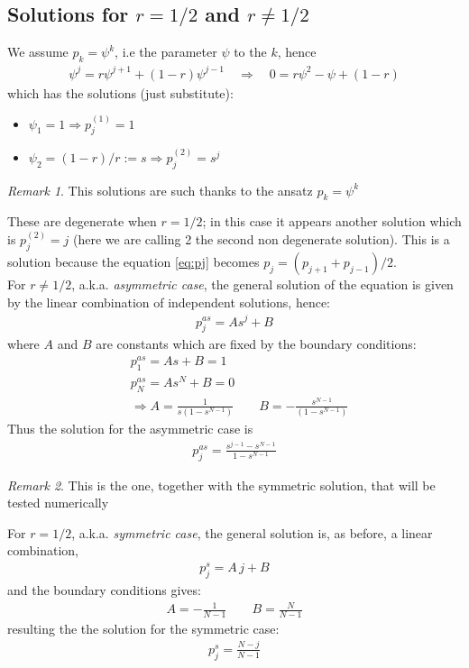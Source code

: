 \documentclass[4apaper,11pt,fleqn]{article}
\theoremstyle{remark}
\newtheorem*{rem}{Remark}
\theoremstyle{definition}
\begin{document}
\subsection{Solutions for $r=1/2$ and $r\neq 1/2$}
We assume $p_k = \psi^k$, i.e the parameter $\psi$ to the $k$, hence
\begin{align*}
  \psi^j = r\psi^{j+1} + (1-r) \psi^{j-1} \quad \Rightarrow \quad 0 = r\psi^2 - \psi + (1-r)
\end{align*}
which has the solutions (just substitute):
\begin{itemize}[leftmargin=*]
  \item $\psi_1 = 1 \Rightarrow p_j^{(1)} = 1$
  \item $\psi_2 = (1-r)/r := s \Rightarrow  p_j^{(2)} = s^j$
\end{itemize}
\begin{rem}
  This solutions are such thanks to the ansatz $p_k = \psi^k$
\end{rem}
These are degenerate when $r=1/2$; in this case it appears another solution which is $p_j^{(2)} = j$ (here we are calling 2 the second non degenerate solution). This is a solution because the equation \eqref{eq:pj} becomes $p_j = (p_{j+1}+p_{j-1})/2$.\\
For $r\neq1/2$, a.k.a. \emph{asymmetric case}, the general solution of the equation is given by the linear combination of independent solutions, hence:
\begin{align*}
  p_j^{as} = As^j + B
\end{align*}
where $A$ and $B$ are constants which are fixed by the boundary conditions:
\begin{align*}
   &p_1^{as} = As + B = 1\\
   &p_N^{as} = As^N + B = 0\\
   &\Rightarrow A= \frac{1}{s(1-s^{N-1})} \qquad B = - \frac{s^{N-1}}{(1-s^{N-1})}
\end{align*}
Thus the solution for the asymmetric case is
\begin{align}
  \boxed{p_j^{as} = \frac{s^{j-1}-s^{N-1}}{1-s^{N-1}}}
\end{align}
\begin{rem}
  This is the one, together with the symmetric solution, that will be tested numerically
\end{rem}

For $r=1/2$, a.k.a. \emph{symmetric case}, the general solution is, as before, a linear combination,
\begin{align*}
    p_j^{s} = A \, j + B
\end{align*}
and the boundary conditions gives:
\begin{align*}
  A = -\frac{1}{N-1} \qquad B = \frac{N}{N-1}
\end{align*}
resulting the the solution for the symmetric case:
\begin{align}
  \label{eq:solS}
  \boxed{p_j^{s} = \frac{N-j}{N-1}}
\end{align}
\end{document}
